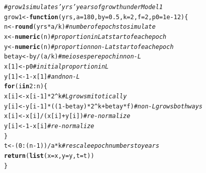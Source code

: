 \documentclass{article}\usepackage[]{graphicx}\usepackage[]{color}
\makeatletter
\newcommand{\hlnum}[1]{\textcolor[rgb]{0.686,0.059,0.569}{#1}}%
\newcommand{\hlcom}[1]{\textcolor[rgb]{0.678,0.584,0.686}{\textit{#1}}}%
\newcommand{\hlopt}[1]{\textcolor[rgb]{0,0,0}{#1}}%
\newcommand{\hlstd}[1]{\textcolor[rgb]{0.345,0.345,0.345}{#1}}%
\newcommand{\hlkwa}[1]{\textcolor[rgb]{0.161,0.373,0.58}{\textbf{#1}}}%
\newcommand{\hlkwb}[1]{\textcolor[rgb]{0.69,0.353,0.396}{#1}}%
\newcommand{\hlkwc}[1]{\textcolor[rgb]{0.333,0.667,0.333}{#1}}%
\newcommand{\hlkwd}[1]{\textcolor[rgb]{0.737,0.353,0.396}{\textbf{#1}}}%
\newenvironment{kframe}{%
 \def\at@end@of@kframe{}%
 \ifinner\ifhmode%
  \def\at@end@of@kframe{\end{minipage}}%
  \begin{minipage}{\columnwidth}%
 \fi\fi%
 \def\FrameCommand##1{\hskip\@totalleftmargin \hskip-\fboxsep
 \colorbox{shadecolor}{##1}\hskip-\fboxsep
     \hskip-\linewidth \hskip-\@totalleftmargin \hskip\columnwidth}%
 \MakeFramed {\advance\hsize-\width
   \@totalleftmargin\z@ \linewidth\hsize
   \@setminipage}}%
 {\par\unskip\endMakeFramed%
 \at@end@of@kframe}
\newenvironment{knitrout}{}{} %
\makeatother
\begin{document}
\begin{knitrout}\footnotesize
{}\color{fgcolor}\begin{kframe}
\begin{alltt}
\hlcom{# grow1 simulates 'yrs' years of growth under Model 1}
\hlstd{grow1} \hlkwb{<-} \hlkwa{function}\hlstd{(}\hlkwc{yrs}\hlstd{,} \hlkwc{a}\hlstd{=}\hlnum{180}\hlstd{,} \hlkwc{by}\hlstd{=}\hlnum{0.5}\hlstd{,} \hlkwc{k}\hlstd{=}\hlnum{2}\hlstd{,} \hlkwc{f}\hlstd{=}\hlnum{2}\hlstd{,} \hlkwc{p0}\hlstd{=}\hlnum{1e-12}\hlstd{)\{}
  \hlstd{n} \hlkwb{<-} \hlkwd{round}\hlstd{(yrs}\hlopt{*}\hlstd{a}\hlopt{/}\hlstd{k)} \hlcom{# number of epochs to simulate}
  \hlstd{x} \hlkwb{<-} \hlkwd{numeric}\hlstd{(n)}     \hlcom{# proportion in L at start of each epoch}
  \hlstd{y} \hlkwb{<-} \hlkwd{numeric}\hlstd{(n)}     \hlcom{# proportion non-L at start of each epoch}
  \hlstd{betay} \hlkwb{<-} \hlstd{by}\hlopt{/}\hlstd{(a}\hlopt{/}\hlstd{k)}   \hlcom{# meioses per epoch in non-L}
  \hlstd{x[}\hlnum{1}\hlstd{]} \hlkwb{<-} \hlstd{p0}          \hlcom{# initial proportion in L}
  \hlstd{y[}\hlnum{1}\hlstd{]} \hlkwb{<-} \hlnum{1}\hlopt{-}\hlstd{x[}\hlnum{1}\hlstd{]}      \hlcom{#   and non-L}
  \hlkwa{for}\hlstd{(i} \hlkwa{in} \hlnum{2}\hlopt{:}\hlstd{n)\{}
    \hlstd{x[i]} \hlkwb{<-} \hlstd{x[i}\hlopt{-}\hlnum{1}\hlstd{]}\hlopt{*}\hlnum{2}\hlopt{^}\hlstd{k}                         \hlcom{# L grows mitotically}
    \hlstd{y[i]} \hlkwb{<-} \hlstd{y[i}\hlopt{-}\hlnum{1}\hlstd{]}\hlopt{*}\hlstd{((}\hlnum{1}\hlopt{-}\hlstd{betay)}\hlopt{*}\hlnum{2}\hlopt{^}\hlstd{k} \hlopt{+} \hlstd{betay}\hlopt{*}\hlstd{f)}   \hlcom{# non-L grows both ways}
    \hlstd{x[i]} \hlkwb{<-} \hlstd{x[i]}\hlopt{/}\hlstd{(x[i]}\hlopt{+}\hlstd{y[i])}                   \hlcom{# re-normalize}
    \hlstd{y[i]} \hlkwb{<-} \hlnum{1}\hlopt{-}\hlstd{x[i]}                             \hlcom{# re-normalize}
  \hlstd{\}}
  \hlstd{t} \hlkwb{<-} \hlstd{(}\hlnum{0}\hlopt{:}\hlstd{(n}\hlopt{-}\hlnum{1}\hlstd{))}\hlopt{/}\hlstd{a}\hlopt{*}\hlstd{k}  \hlcom{# rescale epoch numbers to years}
  \hlkwd{return}\hlstd{(}\hlkwd{list}\hlstd{(}\hlkwc{x}\hlstd{=x,} \hlkwc{y}\hlstd{=y,} \hlkwc{t}\hlstd{=t))}
\hlstd{\}}
\end{alltt}
\end{kframe}
\end{knitrout}
\end{document}
